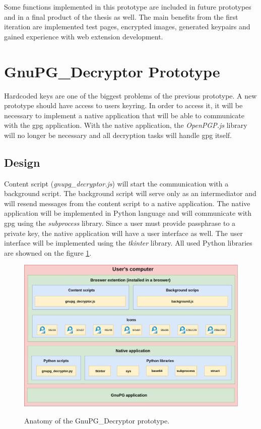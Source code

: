 Some functions implemented in this prototype are included in future prototypes and in a final product of the thesis as well. The main benefits from the first iteration are implemented test pages, encrypted images, generated keypairs and gained experience with web extension development.

\section{GnuPG\_Decryptor Prototype}
\label{prototype:GnuPG_Decryptor}
Hardcoded keys are one of the biggest problems of the previous prototype. A new prototype should have access to users keyring. In order to access it, it will be necessary to implement a native application that will be able to communicate with the gpg application. With the native application, the \textit{OpenPGP.js} library will no longer be necessary and all decryption tasks will handle gpg itself.

\subsection{Design}
Content script (\textit{gnupg\_decryptor.js}) will start the communication with a background script. The background script will serve only as an intermediator and will resend messages from the content script to a native application. The native application will be implemented in Python language and will communicate with gpg using the \textit{subprocess} library. Since a user must provide passphrase to a private key, the native application will have a user interface as well. The user interface will be implemented using the \textit{tkinter} library. All used Python libraries are showned on the figure \ref{img:gnupg_decryptorAnatomy}.

\begin{figure}[H]
    \begin{center}
        \label{img:gnupg_decryptorAnatomy}
        \includegraphics[width=1.0\textwidth]{obrazky-figures/prototype-GnuPG_Decryptor.png}
        \caption{Anatomy of the GnuPG\_Decryptor prototype.}
    \end{center}
\end{figure}


